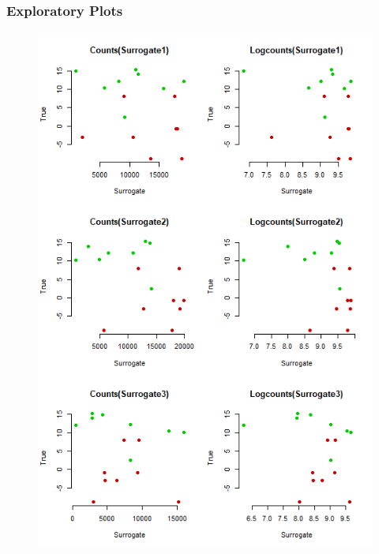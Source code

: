 \documentclass[a4paper,12pt]{article}
\begin{document}
	\subsubsection*{Exploratory Plots}
	\begin{figure}[H]
		\begin{minipage}{0.5\textwidth}
			\includegraphics[scale=0.45]{exploration-1.png}
		\end{minipage}
		\begin{minipage}{0.5\textwidth}

\end{minipage}
\end{figure}
\end{document}
